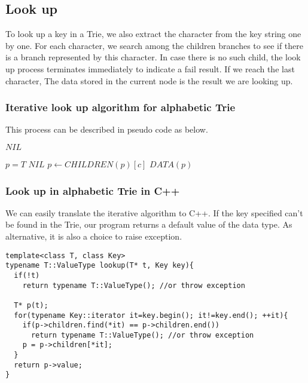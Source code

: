 \documentclass{article}
\begin{document}
\subsection{Look up}
To look up a key in a Trie, we also extract the character from the
key string one by one. For each character, we search among the children
branches to see if there is a branch represented by this character.
In case there is no such child, the look up process terminates
immediately to indicate a fail result. If we reach the last character,
The data stored in the current node is the result we are looking up.

\subsubsection{Iterative look up algorithm for alphabetic Trie}

This process can be described in pseudo code as below.

\begin{algorithmic}[1]
    \State \Return $NIL$
  \EndIf

  \State $p=T$
      \State \Return $NIL$
    \EndIf
    \State $p \leftarrow CHILDREN(p)[c]$
  \EndFor
  \State \Return $DATA(p)$
\EndFunction
\end{algorithmic}

\subsubsection*{Look up in alphabetic Trie in C++}
We can easily translate the iterative algorithm to C++. If the key
specified can't be found in the Trie, our program returns a default
value of the data type. As alternative, it is also a choice to raise
exception.

\lstset{language=C++}
\begin{lstlisting}
template<class T, class Key>
typename T::ValueType lookup(T* t, Key key){
  if(!t)
    return typename T::ValueType(); //or throw exception

  T* p(t);
  for(typename Key::iterator it=key.begin(); it!=key.end(); ++it){
    if(p->children.find(*it) == p->children.end())
      return typename T::ValueType(); //or throw exception
    p = p->children[*it];
  }
  return p->value;
}
\end{lstlisting}
\end{document}
